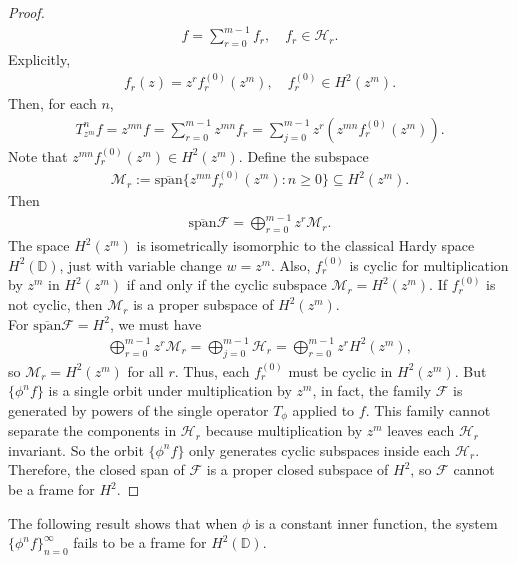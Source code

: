 \documentclass[12pt,titlepage]{amsart}
\theoremstyle{definition}
\theoremstyle{remark}
\begin{document}
\begin{proof}
\begin{eqnarray*}
f = \sum_{r=0}^{m-1} f_r, \quad f_r \in \mathcal{H}_r.
\end{eqnarray*}
Explicitly,
\begin{eqnarray*}
 f_r(z) = z^r f_r^{(0)}(z^m), \quad f_r^{(0)} \in
H^2(z^m).
\end{eqnarray*}
Then, for each $n$,
\begin{eqnarray*}
T_{z^m}^nf=z^{mn} f = \sum_{r=0}^{m-1} z^{mn} f_r=\sum_{j=0}^{m-1}
z^r \left( z^{m n} f_r^{(0)}(z^m) \right).
\end{eqnarray*}
Note that $z^{m n} f_r^{(0)}(z^m) \in H^2(z^m)$. Define the
subspace
\begin{eqnarray*}
\mathcal{M}_r := \overline{\mathrm{span}} \{ z^{m n}
f_r^{(0)}(z^m) : n \ge 0 \} \subseteq H^2(z^m).
\end{eqnarray*}
Then
\begin{eqnarray*}
\overline{\mathrm{span}} \mathcal{F} = \bigoplus_{r=0}^{m-1} z^r
\mathcal{M}_r.
\end{eqnarray*}
The space $H^2(z^m)$ is isometrically isomorphic to the classical
Hardy space $H^2(\mathbb{D})$, just with variable change $w =
z^m$. Also, $f_r^{(0)}$ is cyclic for multiplication by $z^m$ in
$H^2(z^m)$ if and only if the cyclic subspace $\mathcal{M}_r =
H^2(z^m)$. If $f_r^{(0)}$ is not cyclic,
then $\mathcal{M}_r$ is a proper subspace of $H^2(z^m)$.\\
For $\overline{\mathrm{span}} \mathcal{F} = H^2$, we must have
\begin{eqnarray*}
\bigoplus_{r=0}^{m-1} z^r \mathcal{M}_r =\bigoplus_{j=0}^{m-1}
\mathcal{H}_r= \bigoplus_{r=0}^{m-1} z^r H^2(z^m),
\end{eqnarray*}
so $\mathcal{M}_r = H^2(z^m)$ for all $r$. Thus, each $f_r^{(0)}$
must be cyclic in $H^2(z^m)$. But $\{\phi^n f\}$ is a single orbit
under multiplication by $z^m$, in fact, the family $\mathcal{F}$
is generated by powers of the single operator $T_\phi$ applied to
$f$. This family cannot separate the components in $\mathcal{H}_r$
because multiplication by $z^m$ leaves each $\mathcal{H}_r$
invariant. So the orbit $\{\phi^n f\}$ only generates cyclic
subspaces inside each $\mathcal{H}_r$. Therefore, the closed span
of $\mathcal{F}$ is a proper closed subspace of $H^2$, so
$\mathcal{F}$ cannot be a frame for $H^2$.
\end{proof}

The following result shows that when $\phi$ is a constant inner
function, the system $\{\phi^n f\}_{n=0}^\infty$ fails to be a
frame for $H^2(\mathbb{D})$.
\end{document}
